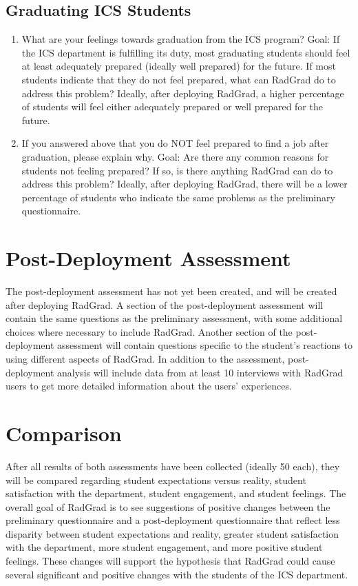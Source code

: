 \subsection{Graduating ICS Students}
\begin{enumerate}
\item What are your feelings towards graduation from the ICS program?
Goal: If the ICS department is fulfilling its duty, most graduating students should feel at least adequately prepared (ideally well prepared) for the future. If most students indicate that they do not feel prepared, what can RadGrad do to address this problem? Ideally, after deploying RadGrad, a higher percentage of students will feel either adequately prepared or well prepared for the future.
\item If you answered above that you do NOT feel prepared to find a job after graduation, please explain why. 
Goal: Are there any common reasons for students not feeling prepared? If so, is there anything RadGrad can do to address this problem? Ideally, after deploying RadGrad, there will be a lower percentage of students who indicate the same problems as the preliminary questionnaire. 
\end{enumerate}

\section{Post-Deployment Assessment}
The post-deployment assessment has not yet been created, and will be created after deploying RadGrad. A section of the post-deployment assessment will contain the same questions as the preliminary assessment, with some additional choices where necessary to include RadGrad. Another section of the post-deployment assessment will contain questions specific to the student's reactions to using different aspects of RadGrad. In addition to the assessment, post-deployment analysis will include data from at least 10 interviews with RadGrad users to get more detailed information about the users' experiences.

\section{Comparison}
After all results of both assessments have been collected (ideally 50 each), they will be compared regarding student expectations versus reality, student satisfaction with the department, student engagement, and student feelings. The overall goal of RadGrad is to see suggestions of positive changes between the preliminary questionnaire and a post-deployment questionnaire that reflect less disparity between student expectations and reality, greater student satisfaction with the department, more student engagement, and more positive student feelings. These changes will support the hypothesis that RadGrad could cause several significant and positive changes with the students of the ICS department.